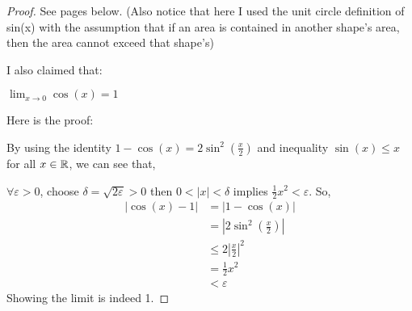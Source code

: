 \documentclass{homework}
\newcommand{\R}{\bb{R}} %
\newcommand{\ra}{\rightarrow}
\newcommand{\?}{\stackrel{?}{=}}
\newcommand{\ep}{\varepsilon}
\theoremstyle{definition}
\begin{document}
\begin{proof}
    See pages below. (Also notice that here I used the unit circle definition of sin(x) with the assumption that if an area is contained in another shape's area, then the area cannot exceed that shape's)

    I also claimed that:

    $\lim_{x\ra0}\cos(x)=1$

    Here is the proof:

    By using the identity $1-\cos(x)=2\sin^2(\frac{x}2)$ and inequality $\sin(x)\leq x$ for all $x\in\R$, we can see that,

    $\forall\ep>0$, choose $\delta=\sqrt{2\ep}>0$ then $0<|x|<\delta$ implies $\frac{1}{2}x^2<\ep$. So, \begin{align*}
        |\cos(x)-1|&=|1-\cos(x)|\\
        &=|2\sin^2(\frac{x}2)|\\
        &\leq 2|\frac{x}2|^2\\
        &=\frac12x^2\\
        &<\ep
    \end{align*}
    Showing the limit is indeed 1.

    
\end{proof}
\end{document}
